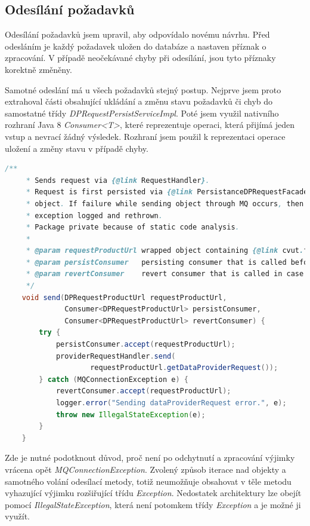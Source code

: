 \documentclass[thesis=B,czech]{FITthesis}[2012/06/26]
\begin{document}
\subsection{Odesílání požadavků}
Odesílání požadavků jsem upravil, aby odpovídalo novému návrhu. Před odesláním je každý požadavek uložen do databáze a nastaven
příznak o zpracování. V případě neočekávané chyby při odesílání, jsou tyto příznaky korektně změněny.
\par
Samotné odeslání má u všech požadavků stejný postup. Nejprve jsem proto extrahoval části obsahující ukládání a změnu stavu požadavků či chyb do samostatné třídy
\textit{DPRequestPersistServiceImpl}. Poté jsem využil nativního rozhraní Java 8 \textit{Consumer<T>}, které reprezentuje
operaci, která přijímá jeden vstup a nevrací žádný výsledek. Rozhraní jsem použil k reprezentaci operace uložení a
změny stavu v případě chyby.
\par
\begin{lstlisting}[language=Java, caption={Společná metoda zajišťující odeslání DataProvider požadavků}]
    /**
     * Sends request via {@link RequestHandler}.
     * Request is first persisted via {@link PersistanceDPRequestFacade} and it's id is set to the request in wrapper
     * object. If failure while sending object through MQ occurs, then {@link Consumer} failureHandler is called,
     * exception logged and rethrown.
     * Package private because of static code analysis.
     *
     * @param requestProductUrl wrapped object containing {@link cvut.fit.persistence.entity.ProductUrl}, {@link DataProviderRequest}
     * @param persistConsumer   persisting consumer that is called before sending
     * @param revertConsumer    revert consumer that is called in case of sending failure
     */
    void send(DPRequestProductUrl requestProductUrl,
              Consumer<DPRequestProductUrl> persistConsumer,
              Consumer<DPRequestProductUrl> revertConsumer) {
        try {
            persistConsumer.accept(requestProductUrl);
            providerRequestHandler.send(
                    requestProductUrl.getDataProviderRequest());
        } catch (MQConnectionException e) {
            revertConsumer.accept(requestProductUrl);
            logger.error("Sending dataProviderRequest error.", e);
            throw new IllegalStateException(e);
        }
    }
\end{lstlisting}

Zde je nutné podotknout důvod, proč není po odchytnutí a zpracování výjimky vrácena opět \textit{MQConnectionException}. 
Zvolený způsob iterace nad objekty a samotného volání odesílací metody, totiž neumožňuje obsahovat v těle metodu
vyhazující výjimku rozšiřující třídu \textit{Exception}.
Nedostatek architektury lze obejít pomocí \textit{IllegalStateException}, která není potomkem třídy \textit{Exception} a je možné ji
využít.
\end{document}
